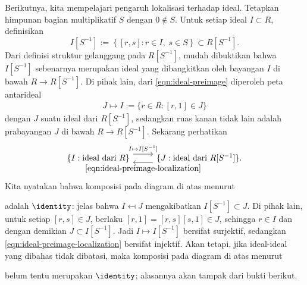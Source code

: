 Berikutnya, kita mempelajari pengaruh lokalisasi terhadap ideal. Tetapkan himpunan bagian multiplikatif $S$ dengan $0 \notin S$. Untuk setiap ideal $I \subset R$, definisikan
\[ I[S^{-1}] := \left\{ [r, s] : r \in I, \; s \in S \right\} \subset R[S^{-1}]. \]
Dari definisi struktur gelanggang pada $R[S^{-1}]$, mudah dibuktikan bahwa $I[S^{-1}]$ sebenarnya merupakan ideal yang dibangkitkan oleh bayangan $I$ di bawah $R \to R[S^{-1}]$. Di pihak lain, dari \eqref{eqn:ideal-preimage} diperoleh peta antarideal
\begin{gather}\label{eqn:ideal-preimage-localization}
	J \mapsto I := \{ r \in R : [r,1] \in J \}
\end{gather}
dengan $J$ suatu ideal dari $R[S^{-1}]$, sedangkan ruas kanan tidak lain adalah prabayangan $J$ di bawah $R \to R[S^{-1}]$. Sekarang perhatikan
\[\begin{tikzcd}
	\left\{ I: \text{ideal dari } R \right\} \arrow[r, yshift=5, "{I \mapsto I[S^{-1}]}"] & \{ J: \text{ideal dari } R[S^{-1}] \}. \arrow[l, yshift=-5, "\eqref{eqn:ideal-preimage-localization}"]
\end{tikzcd}\]
Kita nyatakan bahwa komposisi pada diagram di atas menurut
adalah $\identity$: jelas bahwa $I \mapsfrom J$ mengakibatkan $I[S^{-1}] \subset J$. Di pihak lain, untuk setiap $[r,s] \in J$, berlaku $[r,1] = [r,s][s,1] \in J$, sehingga $r \in I$ dan dengan demikian $J \subset I[S^{-1}]$. Jadi $I \mapsto I[S^{-1}]$ bersifat surjektif, sedangkan \eqref{eqn:ideal-preimage-localization} bersifat injektif. Akan tetapi, jika ideal-ideal yang dibahas tidak dibatasi, maka komposisi pada diagram di atas menurut
belum tentu merupakan $\identity$; alasannya akan tampak dari bukti berikut.

